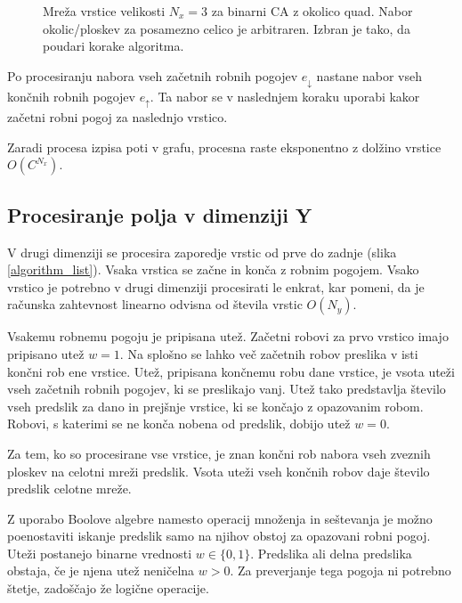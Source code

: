\documentclass[12pt,a4paper,openany,twoside]{book}
\begin{document}
\begin{figure}[htb]
\centerline{}
\caption[Algoritem procesiranja vrstice.]{Mreža vrstice velikosti \(N_x=3\) za binarni CA z okolico quad.
Nabor okolic/ploskev za posamezno celico je arbitraren. Izbran je tako, da poudari korake algoritma.}
\label{algorithm_line}
\end{figure}
\vspace{5mm}

Po procesiranju nabora vseh začetnih robnih pogojev \(e_{\downarrow}\)
nastane nabor vseh končnih robnih pogojev \(e_{\uparrow}\).
Ta nabor se v naslednjem koraku uporabi kakor začetni robni pogoj za naslednjo vrstico.

Zaradi procesa izpisa poti v grafu,
procesna raste eksponentno z dolžino vrstice \(O(C^{N_x})\).

\subsection{Procesiranje polja v dimenziji Y}

V drugi dimenziji se procesira zaporedje vrstic od prve do zadnje (slika \ref{algorithm_list}).
Vsaka vrstica se začne in konča z robnim pogojem.
Vsako vrstico je potrebno v drugi dimenziji procesirati le enkrat, kar pomeni,
da je računska zahtevnost linearno odvisna od števila vrstic \(O(N_y)\).

Vsakemu robnemu pogoju je pripisana utež. Začetni robovi za prvo vrstico imajo pripisano utež \(w=1\).
Na splošno se lahko več začetnih robov preslika v isti končni rob ene vrstice.
Utež, pripisana končnemu robu dane vrstice, je vsota uteži vseh začetnih robnih pogojev, ki se preslikajo vanj.
Utež tako predstavlja število vseh predslik za dano in prejšnje vrstice, ki se končajo z opazovanim robom.
Robovi, s katerimi se ne konča nobena od predslik, dobijo utež \(w=0\).

Za tem, ko so procesirane vse vrstice, je znan končni rob nabora vseh zveznih ploskev na celotni mreži predslik.
Vsota uteži vseh končnih robov daje število predslik celotne mreže.

Z uporabo Boolove algebre namesto operacij množenja in seštevanja
je možno poenostaviti iskanje predslik samo na njihov obstoj za opazovani robni pogoj.
Uteži postanejo binarne vrednosti \(w \in \{0, 1\}\).
Predslika ali delna predslika obstaja, če je njena utež neničelna \(w>0\).
Za preverjanje tega pogoja ni potrebno štetje, zadoščajo že logične operacije.
\end{document}
